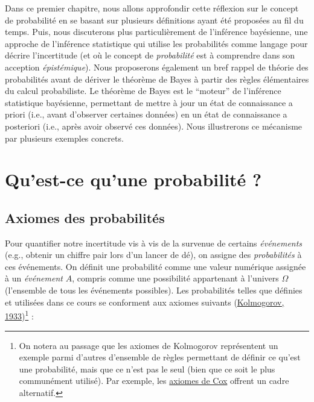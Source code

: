 \documentclass[
  a4paper,11pt,twoside,onecolumn,openright,final,oldfontcommands]{memoir}
\theoremstyle{definition}
\theoremstyle{definition}
\theoremstyle{definition}
\theoremstyle{remark}
\begin{document}
Dans ce premier chapitre, nous allons approfondir cette réflexion sur le concept de probabilité en se basant sur plusieurs définitions ayant été proposées au fil du temps. Puis, nous discuterons plus particulièrement de l'inférence bayésienne, une approche de l'inférence statistique qui utilise les probabilités comme langage pour décrire l'incertitude (et où le concept de \emph{probabilité} est à comprendre dans son acception \emph{épistémique}). Nous proposerons également un bref rappel de théorie des probabilités avant de dériver le théorème de Bayes à partir des règles élémentaires du calcul probabiliste. Le théorème de Bayes est le ``moteur'' de l'inférence statistique bayésienne, permettant de mettre à jour un état de connaissance a priori (i.e., avant d'observer certaines données) en un état de connaissance a posteriori (i.e., après avoir observé ces données). Nous illustrerons ce mécanisme par plusieurs exemples concrets.

\hypertarget{quest-ce-quune-probabilituxe9}{%
\section{Qu'est-ce qu'une probabilité ?}\label{quest-ce-quune-probabilituxe9}}

\hypertarget{axiomes-des-probabilituxe9s}{%
\subsection{Axiomes des probabilités}\label{axiomes-des-probabilituxe9s}}

Pour quantifier notre incertitude vis à vis de la survenue de certains \emph{événements} (e.g., obtenir un chiffre pair lors d'un lancer de dé), on assigne des \emph{probabilités} à ces événements. On définit une probabilité comme une valeur numérique assignée à un \emph{événement} \(A\), compris comme une possibilité appartenant à l'univers \(\Omega\) (l'ensemble de tous les événements possibles). Les probabilités telles que définies et utilisées dans ce cours se conforment aux axiomes suivants (\protect\hyperlink{ref-kolmogorov_foundations_1933}{Kolmogorov, 1933})\footnote{On notera au passage que les axiomes de Kolmogorov représentent un exemple parmi d'autres d'ensemble de règles permettant de définir ce qu'est une probabilité, mais que ce n'est pas le seul (bien que ce soit le plus communément utilisé). Par exemple, les \href{https://en.wikipedia.org/wiki/Cox\%27s_theorem}{axiomes de Cox} offrent un cadre alternatif.} :
\end{document}
